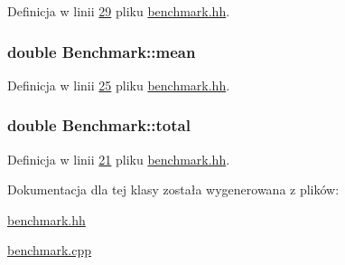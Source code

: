 Definicja w linii \hyperlink{benchmark_8hh_source_l00029}{29} pliku \hyperlink{benchmark_8hh_source}{benchmark.\-hh}.

\hypertarget{class_benchmark_aa88092b6164ad7d1243162d3012f729a}{
\subsubsection[{mean}]{\setlength{\rightskip}{0pt plus 5cm}double Benchmark\-::mean\hspace{0.3cm}{\ttfamily [private]}}}\label{class_benchmark_aa88092b6164ad7d1243162d3012f729a}


Definicja w linii \hyperlink{benchmark_8hh_source_l00025}{25} pliku \hyperlink{benchmark_8hh_source}{benchmark.\-hh}.

\hypertarget{class_benchmark_a7130c0718e3a3ab2fea70285dab122a2}{
\subsubsection[{total}]{\setlength{\rightskip}{0pt plus 5cm}double Benchmark\-::total\hspace{0.3cm}{\ttfamily [private]}}}\label{class_benchmark_a7130c0718e3a3ab2fea70285dab122a2}


Definicja w linii \hyperlink{benchmark_8hh_source_l00021}{21} pliku \hyperlink{benchmark_8hh_source}{benchmark.\-hh}.



Dokumentacja dla tej klasy została wygenerowana z plików\-:\begin{DoxyCompactItemize}
\item 
\hyperlink{benchmark_8hh}{benchmark.\-hh}\item 
\hyperlink{benchmark_8cpp}{benchmark.\-cpp}\end{DoxyCompactItemize}
